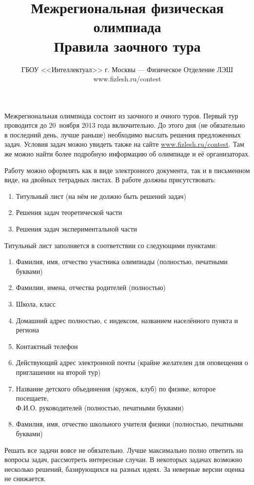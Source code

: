\documentclass[a4paper,12pt]{article}
\title{\bf Межрегиональная физическая олимпиада\\Правила заочного тура}
\author{ГБОУ <<Интеллектуал>> г. Москвы --- Физическое Отделение ЛЭШ\\
www.fizlesh.ru/contest}
\begin{document}
\maketitle

Межрегиональная олимпиада состоит из заочного и очного туров. Первый тур проводится до 20~ноября 2013 года включительно.
До этого дня (не обязательно  в последний день, лучше раньше) необходимо выслать решения предложенных задач.
Условия задач можно увидеть также на сайте \href{http://fizlesh.ru/contest}{www.fizlesh.ru/contest}.
Там же можно найти более подробную информацию об олимпиаде и её организаторах.

\bigskip

Работу можно оформлять как в виде электронного документа, так и в письменном виде, на двойных тетрадных листах.
В работе должны присутствовать:
\begin{enumerate}
\setlength{\itemsep}{-3pt}
\item Титульный лист (на нём не должно быть решений задач)
\item Решения задач теоретической части
\item Решения задач экспериментальной части
\end{enumerate}

Титульный лист заполняется в соответствии со следующими пунктами:
\begin{enumerate}
\setlength{\itemsep}{-3pt}
\item Фамилия, имя, отчество участника олимпиады (полностью, печатными буквами)
\item Фамилии, имена, отчества родителей (полностью)
\item Школа, класс
\item Домашний адрес полностью, с индексом, названием населённого пункта и региона
\item Контактный телефон
\item Действующий адрес электронной почты (крайне желателен для оповещения о приглашении на второй тур)
\item Название детского объединения (кружок, клуб) по физике, которое посещаете,\\
Ф.И.О. руководителей (полностью, печатными буквами)
\item Фамилия, имя, отчество школьного учителя физики (полностью, печатными буквами)
\end{enumerate}


\bigskip

Решать все задачи вовсе не обязательно. Лучше максимально полно ответить на вопросы задач,
рассмотреть интересные случаи. В некоторых задачах возможно несколько решений, базирующихся
на разных идеях. За неверные версии оценка не снижается.
\end{document}
